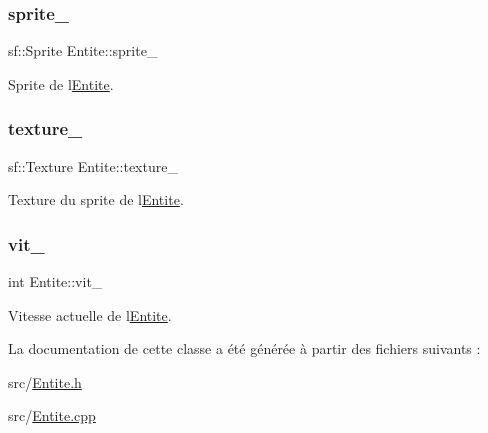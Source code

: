 \subsubsection{\texorpdfstring{sprite\+\_\+}{sprite\_}}
{\footnotesize\ttfamily sf\+::\+Sprite Entite\+::sprite\+\_\+\hspace{0.3cm}{\ttfamily [protected]}}



Sprite de l\textquotesingle{}\hyperlink{class_entite}{Entite}. 

\mbox{\label{class_entite_a8147b9459318a9b1de1b72dce115680a}} 
\subsubsection{\texorpdfstring{texture\+\_\+}{texture\_}}
{\footnotesize\ttfamily sf\+::\+Texture Entite\+::texture\+\_\+\hspace{0.3cm}{\ttfamily [protected]}}



Texture du sprite de l\textquotesingle{}\hyperlink{class_entite}{Entite}. 

\mbox{\label{class_entite_a62c3145096f707457d60306ea6729ed6}} 
\subsubsection{\texorpdfstring{vit\+\_\+}{vit\_}}
{\footnotesize\ttfamily int Entite\+::vit\+\_\+\hspace{0.3cm}{\ttfamily [protected]}}



Vitesse actuelle de l\textquotesingle{}\hyperlink{class_entite}{Entite}. 



La documentation de cette classe a été générée à partir des fichiers suivants \+:\begin{DoxyCompactItemize}
\item 
src/\hyperlink{_entite_8h}{Entite.\+h}\item 
src/\hyperlink{_entite_8cpp}{Entite.\+cpp}\end{DoxyCompactItemize}
